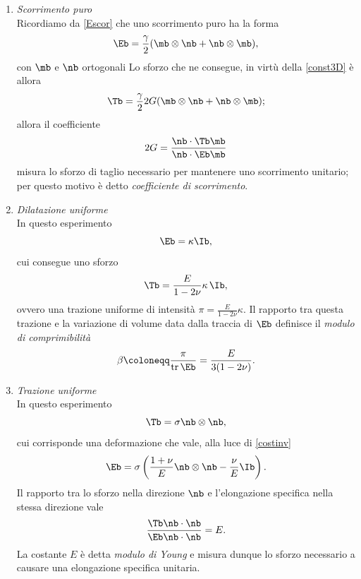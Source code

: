 \vspace{.3cm}


\begin{enumerate}
	\item \textit{Scorrimento puro}\\
	Ricordiamo da \eqref{Escor} che uno scorrimento puro ha la forma 
	\begin{equation}
		\Eb=\frac{\gamma}{2}(\mb\otimes \nb+\nb\otimes \mb),
	\end{equation}
	con $\mb$ e $\nb$ ortogonali
	Lo sforzo che ne consegue, in virtù della \eqref{const3D} è allora
	\begin{equation}
		\Tb=\frac{\gamma}{2}2G(\mb\otimes \nb+\nb\otimes \mb);
	\end{equation}
	allora il coefficiente
	\begin{equation}
		2G=\frac{\nb \cdot \Tb \mb}{\nb \cdot \Eb \mb}
	\end{equation}
	misura lo sforzo di taglio necessario per mantenere uno scorrimento unitario; per questo motivo è detto \textit{coefficiente di scorrimento}.
	
	\item \textit{Dilatazione uniforme}\\
	In questo esperimento
	\begin{equation}
		\Eb=\kappa \Ib,
	\end{equation}
	cui consegue uno sforzo
	\begin{equation}
		\Tb=\frac{E}{1-2\nu}\kappa \,\Ib,
	\end{equation}
	ovvero una trazione uniforme di intensità $\pi=\frac{E}{1-2\nu}\kappa $. Il rapporto tra questa trazione e la variazione di volume data dalla traccia di $\Eb$ definisce il \textit{modulo di comprimibilità}
	\begin{equation}\label{compr}
		\beta\coloneqq \frac{\pi}{\operatorname{tr}\Eb}=\frac{E}{3(1-2\nu)}.
	\end{equation}
	
	\item \textit{Trazione uniforme}\\
	In questo esperimento
	\begin{equation}
		\Tb = \sigma\nb \otimes \nb,
	\end{equation}
	cui corrisponde una deformazione che vale, alla luce di \eqref{costinv}
	\begin{equation}
		\Eb=\sigma\left(\frac{1+\nu}{E}\nb \otimes \nb-\frac{\nu}{E}\Ib  \right).
	\end{equation}
	Il rapporto tra lo sforzo nella direzione $\nb$ e l'elongazione specifica nella stessa direzione vale
	\begin{equation}
		\frac{\Tb \nb \cdot \nb}{\Eb \nb \cdot \nb}=E.
	\end{equation}
	La costante $E$ è detta \textit{modulo di Young} e misura dunque lo sforzo  necessario a causare una elongazione specifica unitaria.
	

\end{enumerate}
